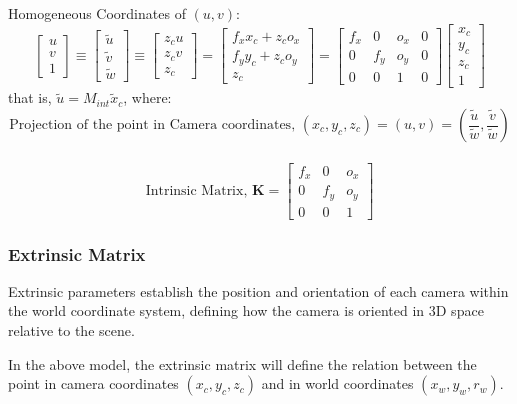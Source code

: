 Homogeneous Coordinates of \( (u, v) \):
\[
	\begin{bmatrix} u \\ v \\ 1 \end{bmatrix} \equiv \begin{bmatrix} \tilde{u} \\ \tilde{v} \\ \tilde{w} \end{bmatrix} \equiv \begin{bmatrix} z_c u \\ z_c v \\ z_c \end{bmatrix} = \begin{bmatrix} f_x x_c + z_c o_x \\ f_y y_c + z_c o_y \\ z_c \end{bmatrix} = \begin{bmatrix} f_x & 0 & o_x & 0 \\ 0 & f_y & o_y & 0 \\ 0 & 0 & 1 & 0 \end{bmatrix} \begin{bmatrix} x_c \\ y_c \\ z_c \\ 1 \end{bmatrix}
\]
that is, $\tilde{u} = M_{int}\tilde{x}_c$,
where:
\[
	\text{Projection of the point in Camera coordinates, } (x_c, y_c, z_c) = (u, v) = \left( \frac{\tilde{u}}{\tilde{w}}, \frac{\tilde{v}}{\tilde{w}} \right)
\]
\\
\[
	\text{Intrinsic Matrix, } \mathbf{K} =
	\begin{bmatrix}
		f_x & 0   & o_x \\
		0   & f_y & o_y \\
		0   & 0   & 1
	\end{bmatrix}
\]

\subsubsection{Extrinsic Matrix}
Extrinsic parameters establish the position and orientation of each camera within the world coordinate system, defining how the camera is oriented in 3D space relative to the scene.

In the above model, the extrinsic matrix will define the relation between the point in camera coordinates
$(x_c, y_c, z_c)$ and in world coordinates $(x_w, y_w, r_w)$.

